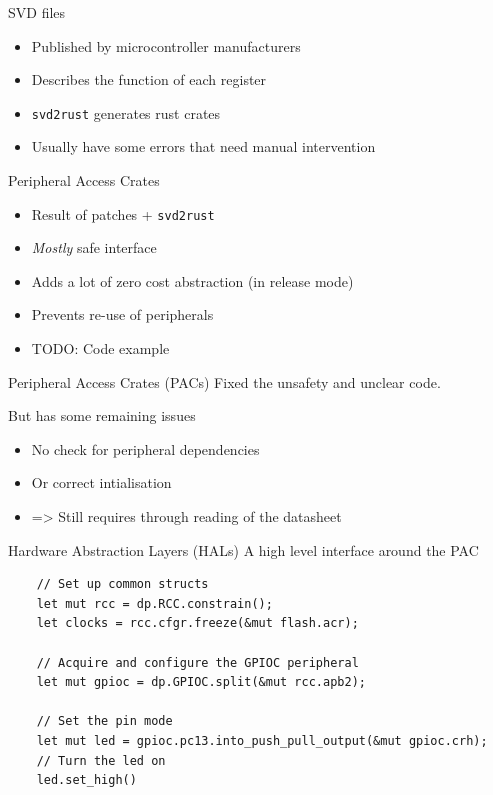 \documentclass[169]{beamer}
\begin{document}
\begin{frame}{SVD files}
    \begin{itemize}
        \item{Published by microcontroller manufacturers}
        \item{Describes the function of each register}
        \item{\texttt{svd2rust} generates rust crates}
        \item{Usually have some errors that need manual intervention}
    \end{itemize}
\end{frame}

\begin{frame}{Peripheral Access Crates}
    \begin{itemize}
        \item{Result of patches + \texttt{svd2rust}}
        \item{\textit{Mostly} safe interface}
        \item{Adds a lot of zero cost abstraction (in release mode)}
        \item{Prevents re-use of peripherals}
        \item{TODO: Code example}
    \end{itemize}
\end{frame}

\begin{frame}{Peripheral Access Crates (PACs)}
    Fixed the unsafety and unclear code.

    But has some remaining issues

    \begin{itemize}
        \item{No check for peripheral dependencies}
        \item{Or correct intialisation}
        \item{=> Still requires through reading of the datasheet}
    \end{itemize}
\end{frame}

\begin{frame}[fragile]{Hardware Abstraction Layers (HALs)}
    A high level interface around the PAC

    \lstset{language=rust}
    \begin{lstlisting}
    // Set up common structs
    let mut rcc = dp.RCC.constrain();
    let clocks = rcc.cfgr.freeze(&mut flash.acr);

    // Acquire and configure the GPIOC peripheral
    let mut gpioc = dp.GPIOC.split(&mut rcc.apb2);

    // Set the pin mode
    let mut led = gpioc.pc13.into_push_pull_output(&mut gpioc.crh);
    // Turn the led on
    led.set_high()
    \end{lstlisting}
\end{frame}
\end{document}
